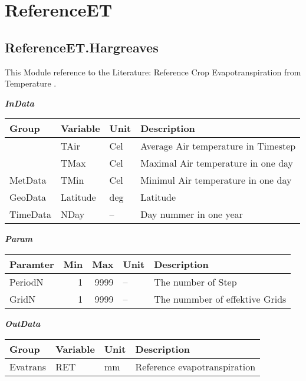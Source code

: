 \documentclass[
]{book}
\begin{document}
\hypertarget{ReferenceET}{%
\section{ReferenceET}\label{ReferenceET}}

\hypertarget{ReferenceET.Hargreaves}{%
\subsection{ReferenceET.Hargreaves}\label{ReferenceET.Hargreaves}}

This Module reference to the Literature: Reference Crop Evapotranspiration from Temperature \citep{GeorgeH.Hargreaves.1985}.

\textbf{\emph{InData}}

\begin{table}[!h]
\centering
\begin{tabular}{l|l|l|l}
\hline
Group & Variable & Unit & Description\\
\hline
 & TAir & Cel & Average Air temperature in Timestep\\
\cline{2-4}
 & TMax & Cel & Maximal Air temperature in one day\\
\cline{2-4}
\multirow{-3}{*}{\raggedright\arraybackslash MetData} & TMin & Cel & Minimul Air temperature in one day\\
\cline{1-4}
GeoData & Latitude & deg & Latitude\\
\cline{1-4}
TimeData & NDay & -- & Day nummer in one year\\
\hline
\end{tabular}
\end{table}

\textbf{\emph{Param}}

\begin{table}[!h]
\centering
\begin{tabular}{l|r|r|l|l}
\hline
Paramter & Min & Max & Unit & Description\\
\hline
PeriodN & 1 & 9999 & -- & The number of Step\\
\cline{1-5}
GridN & 1 & 9999 & -- & The nummber of effektive Grids\\
\hline
\end{tabular}
\end{table}

\textbf{\emph{OutData}}

\begin{table}[!h]
\centering
\begin{tabular}{l|l|l|l}
\hline
Group & Variable & Unit & Description\\
\hline
Evatrans & RET & mm & Reference evapotranspiration\\
\hline
\end{tabular}
\end{table}
\end{document}
